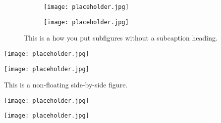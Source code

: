 \documentclass[10pt,oneside]{book}
\begin{document}
\begin{figure}
    \centering
    \begin{subfigure}[b]{0.45\linewidth}
      \texttt{[image: placeholder.jpg]}
    \end{subfigure}
    \qquad
    \begin{subfigure}[b]{0.45\linewidth}
      \texttt{[image: placeholder.jpg]}
    \end{subfigure}
  \caption{This is a how you put subfigures without a subcaption heading.}
\end{figure}



\begin{widefigure}
\centering
\begin{minipage}{.48\linewidth}
  \centering
  \texttt{[image: placeholder.jpg]}
  \label{fig:graph1}
\end{minipage}%
\qquad
\begin{minipage}{.48\linewidth}
  \centering
  \texttt{[image: placeholder.jpg]}
  \label{fig:graph2}
\end{minipage}
\end{widefigure}



\noindent
\begin{minipage}{\textwidth}
  This is a non-floating side-by-side figure.

\flushleft
\begin{minipage}{.48\linewidth}
  \centering
  \texttt{[image: placeholder.jpg]}
  \label{fig:graph1}
\end{minipage}%
\quad
\begin{minipage}{.48\linewidth}
  \centering
  \texttt{[image: placeholder.jpg]}
  \label{fig:graph2}
\end{minipage}
\end{minipage}
\end{document}
